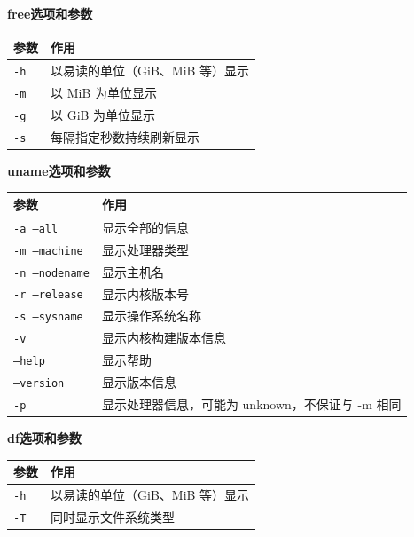 \begin{table}[H]\centering
\textbf{free\enspace 选项和参数}

	\begin{tabular}{p{}p{}}
		\toprule[1.5pt]
		参数 & 作用\\
		\midrule[1pt]
		\texttt{-h}		&以易读的单位（GiB、MiB 等）显示\\
		\texttt{-m}		&以 MiB 为单位显示\\
		\texttt{-g}		&以 GiB 为单位显示\\
		\texttt{-s}\enspace [秒数] 		&每隔指定秒数持续刷新显示\\
		\bottomrule[1.5pt]
	\end{tabular}
\end{table}



\begin{table}[H]\centering
\textbf{uname\enspace 选项和参数}

	\begin{tabular}{p{}p{}}
		\toprule[1.5pt]
		参数 & 作用\\
		\midrule[1pt]
		\texttt{-a  --all}		&显示全部的信息\\
		\texttt{-m  --machine}		&显示处理器类型\\
		\texttt{-n  --nodename}		&显示主机名\\
		\texttt{-r  --release}		&显示内核版本号\\
		\texttt{-s  --sysname}		&显示操作系统名称\\
		\texttt{-v}		&显示内核构建版本信息\\
		\texttt{--help}		&显示帮助\\
		\texttt{--version}		&显示版本信息\\
		\texttt{-p}		&显示处理器信息，可能为 unknown，不保证与 -m 相同\\
		\bottomrule[1.5pt]
	\end{tabular}
\end{table}



\begin{table}[H]\centering
\textbf{df\enspace 选项和参数}

	\begin{tabular}{p{}p{}}
		\toprule[1.5pt]
		参数 & 作用\\
		\midrule[1pt]
		\texttt{-h}		&以易读的单位（GiB、MiB 等）显示\\
		\texttt{-T}		&同时显示文件系统类型\\
		\bottomrule[1.5pt]
	\end{tabular}
\end{table}




